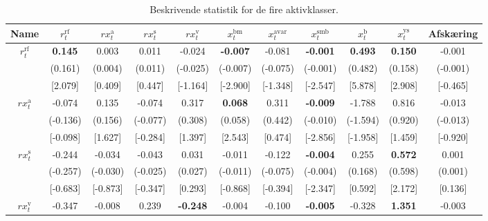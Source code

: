 \documentclass[
  a4paper,
  oneside]{memoir}
\begin{document}
\begin{landscape}
\begin{table}[H]

\caption{\label{tab:VAR-TAB}Beskrivende statistik for de fire aktivklasser.}
\centering
\begin{threeparttable}
\begin{tabular}[t]{ccccccccccc}
\toprule
Name & $r_t^{\text{rf}}$ & $rx_t^{\text{a}}$ & $rx_t^{\text{s}}$ & $rx_t^{\text{v}}$ & $x_t^{\text{bm}}$ & $x_t^{\text{avar}}$ & $x_t^{\text{smb}}$ & $x_t^{\text{b}}$ & $x_t^{\text{ys}}$ & Afskæring\\
\midrule
\rowcolor{gray!6}  $r_t^{\text{rf}}$ & \textbf{  0.145} & 0.003 & 0.011 & -0.024 & \textbf{-0.007} & -0.081 & \textbf{-0.001} & \textbf{ 0.493} & \textbf{ 0.150} & -0.001\\
 
 & (0.161) & (0.004) & (0.011) & (-0.025) & (-0.007) & (-0.075) & (-0.001) & (0.482) & (0.158) & (-0.001)\\
 
\rowcolor{gray!6}   & [2.079] & [0.409] & [0.447] & [-1.164] & [-2.900] & [-1.348] & [-2.547] & [5.878] & [2.908] & [-0.465]\\
 
$rx_t^{\text{a}}$ & -0.074 & 0.135 & -0.074 & 0.317 & \textbf{ 0.068} & 0.311 & \textbf{-0.009} & -1.788 & 0.816 & -0.013\\
 
\rowcolor{gray!6}   & (-0.136) & (0.156) & (-0.077) & (0.308) & (0.058) & (0.442) & (-0.010) & (-1.594) & (0.920) & (-0.013)\\
 
 & [-0.098] & [1.627] & [-0.284] & [1.397] & [2.543] & [0.474] & [-2.856] & [-1.958] & [1.459] & [-0.920]\\
 
\rowcolor{gray!6}  $rx_t^{\text{s}}$ & -0.244 & -0.034 & -0.043 & 0.031 & -0.011 & -0.122 & \textbf{-0.004} & 0.255 & \textbf{ 0.572} & 0.001\\
 
 & (-0.257) & (-0.030) & (-0.025) & (0.027) & (-0.011) & (-0.075) & (-0.004) & (0.168) & (0.598) & (0.001)\\
 
\rowcolor{gray!6}   & [-0.683] & [-0.873] & [-0.347] & [0.293] & [-0.868] & [-0.394] & [-2.347] & [0.592] & [2.172] & [0.136]\\
 
$rx_t^{\text{v}}$ & -0.347 & -0.008 & 0.239 & \textbf{-0.248} & -0.004 & -0.100 & \textbf{-0.005} & -0.328 & \textbf{ 1.351} & -0.003\\
 

\end{tabular}
\end{threeparttable}
\end{table}
\end{landscape}
\end{document}
